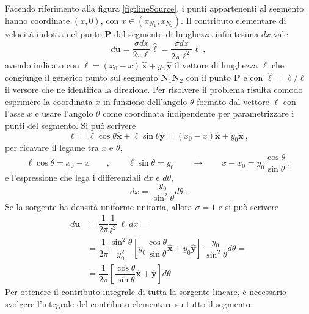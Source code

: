 \noindent
Facendo riferimento alla figura \ref{fig:lineSource}, i punti appartenenti al segmento hanno coordinate $(x,0)$, con $x \in (x_{N_1},x_{N_2})$. 
%
Il contributo elementare di velocità indotta nel punto $\bm{P}$ dal segmento di lunghezza infinitesima $dx$ vale
\begin{equation}
 d\bm{u} = \dfrac{\sigma dx}{2\pi \ell} \bm{\hat{\ell}} = \dfrac{\sigma dx}{2\pi \ell^2} \bm{\ell} \ ,
\end{equation}
avendo indicato con $\bm{\ell} = (x_0 - x) \, \bm{\hat{x}} + y_0 \, \bm{\hat{y}}$ il vettore di lunghezza $\ell$ che congiunge il generico punto sul segmento $\bm{N}_1 \bm{N}_2$ con il punto $\bm{P}$ e con $\bm{\hat{\ell}} = \bm{\ell} / \ell$ il versore che ne identifica la direzione.
%
Per risolvere il problema risulta comodo esprimere la coordinata $x$ in funzione dell'angolo $\theta$ formato dal vettore $\bm{\ell}$ con l'asse $x$ e usare l'angolo $\theta$ come coordinata indipendente per parametrizzare i punti del segmento. Si può scrivere
\begin{equation}
 \bm{\ell} = \ell \cos \theta \bm{\hat{x}} + \ell \sin \theta \bm{\hat{y}} = 
 (x_0 - x) \bm{\hat{x}} + y_0 \bm{\hat{x}} \ ,
\end{equation}
per ricavare il legame tra $x$ e $\theta$,
\begin{equation}
 \ell \cos \theta = x_0 - x \qquad , \qquad \ell \sin \theta = y_0 \qquad \rightarrow \qquad x-x_0 = y_0 \dfrac{\cos \theta}{\sin \theta} \ ,
\end{equation}
e l'espressione che lega i differenziali $dx$ e $d\theta$,
\begin{equation}
 dx = \dfrac{y_0}{\sin^2 \theta} d \theta \ .
\end{equation}
Se la sorgente ha densità uniforme unitaria, allora $\sigma = 1$ e si può scrivere
%
\begin{equation}
\begin{aligned}
 d\bm{u} & = \dfrac{1}{2\pi} \dfrac{1}{\ell^2} \ \bm{\ell}\  dx = \\
 & = \dfrac{1}{2\pi} \dfrac{\sin^2 \theta}{y_0^2} \left[ y_0 \dfrac{\cos \theta}{ \sin \theta} \bm{\hat{x}} + y_0 \bm{\hat{y}} \right] \ \dfrac{y_0}{\sin^2 \theta} d\theta = \\
 & = \dfrac{1}{2\pi} \left[ \dfrac{\cos \theta}{\sin \theta} \bm{\hat{x}} + \bm{\hat{y}} \right] d \theta 
\end{aligned}
\end{equation}
%
Per ottenere il contributo integrale di tutta la sorgente lineare, è necessario svolgere l'integrale del contributo elementare su tutto il segmento
